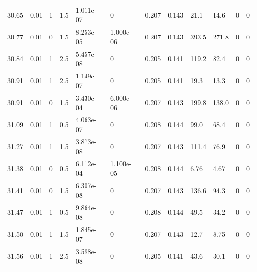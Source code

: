 \documentclass[preview]{standalone}
\begin{document}
{{{{{{{{{\begin{tabular}{L{1.2cm}C{1.2cm} C{0.3cm}C{0.5cm} C{1.4cm}C{1.4cm} C{1.4cm}C{1.4cm} C{1.6cm}C{1.6cm} C{1.6cm}C{1.6cm}}
  30.65  &  0.01  & 1     & 1.5 &  1.011e-07  & 0  &  0.207&   0.143& 21.1 & 14.6   &  0 & 0  \\ 
  30.77  &  0.01  & 0     & 1.5 &  8.253e-05  & 1.000e-06  &  0.207&   0.143& 393.5 & 271.8   &  0 & 0  \\ 
  30.84  &  0.01  & 1     & 2.5 &  5.457e-08  & 0  &  0.205&   0.141& 119.2 & 82.4   &  0 & 0  \\ 
  30.91  &  0.01  & 1     & 2.5 &  1.149e-07  & 0  &  0.205&   0.141& 19.3 & 13.3   &  0 & 0  \\ 
  30.91  &  0.01  & 0     & 1.5 &  3.430e-04  & 6.000e-06  &  0.207&   0.143& 199.8 & 138.0   &  0 & 0  \\ 
  31.09  &  0.01  & 1     & 0.5 &  4.063e-07  & 0  &  0.208&   0.144& 99.0 & 68.4   &  0 & 0  \\ 
  31.27  &  0.01  & 1     & 1.5 &  3.873e-08  & 0  &  0.207&   0.143& 111.4 & 76.9   &  0 & 0  \\ 
  31.38  &  0.01  & 0     & 0.5 &  6.112e-04  & 1.100e-05  &  0.208&   0.144& 6.76 & 4.67   &  0 & 0  \\ 
  31.41  &  0.01  & 0     & 1.5 &  6.307e-08  & 0  &  0.207&   0.143& 136.6 & 94.3   &  0 & 0  \\ 
  31.47  &  0.01  & 1     & 0.5 &  9.864e-08  & 0  &  0.208&   0.144& 49.5 & 34.2   &  0 & 0  \\ 
  31.50  &  0.01  & 1     & 1.5 &  1.845e-07  & 0  &  0.207&   0.143& 12.7 & 8.75   &  0 & 0  \\ 
  31.56  &  0.01  & 1     & 2.5 &  3.588e-08  & 0  &  0.205&   0.141& 43.6 & 30.1   &  0 & 0  \\ 
\hline 
\end{tabular} 

}}}}}}}}}
\end{document}
